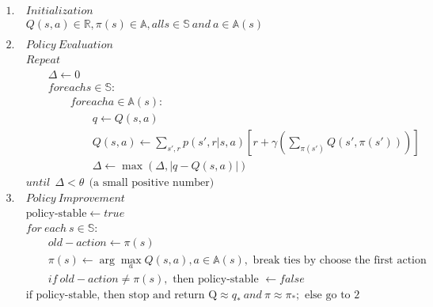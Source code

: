 \documentclass{article}
\begin{document}
\[
  \begin{aligned}
    1. \ & Initialization\\
    & Q(s, a) \in \mathbb{R}, \pi(s) \in \mathbb{A}, all s \in \mathbb{S} \ and \ a \in \mathbb{A}(s)\\
    \\
    2. \ & Policy \ Evaluation\\
    &Repeat\\
    &\qquad \Delta \leftarrow 0\\
    &\qquad for each s \in \mathbb{S}:\\
    &\qquad \qquad for each a \in \mathbb{A}(s):\\
    &\qquad \qquad \qquad q \leftarrow Q(s, a)\\
    &\qquad \qquad \qquad Q(s, a) \leftarrow \sum_{s', r} p(s',r|s,a)[r + \gamma (\sum_{\pi(s')}Q(s',\pi(s')))]\\
    &\qquad \qquad \qquad \Delta \leftarrow \max (\Delta, |q - Q(s,a)|)\\
    &until \ \ \Delta < \theta \ \ \text{(a small positive number)}
    \\
    3. \ & Policy \ Improvement\\
    &\text{policy-stable} \leftarrow true\\
    &for \ each \ s \in \mathbb{S}:\\
    &\qquad old-action \leftarrow \pi(s)\\
    &\qquad \pi(s) \leftarrow \arg\max_a Q(s, a), a \in \mathbb{A}(s), \text{ break ties by choose the first action}\\
    &\qquad if \ old-action \not= \pi(s), \text { then policy-stable }  \leftarrow false\\
    &\text {if policy-stable, then stop and return Q}  \approx q_* \ and \ \pi \approx \pi_*; \text { else go to 2}
  \end{aligned}
\]
\end{document}
